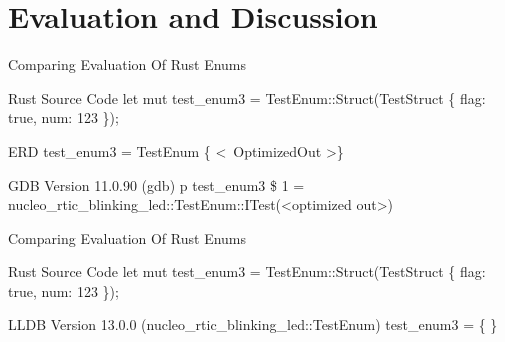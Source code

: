 \section{Evaluation and Discussion}

\begin{frame}{Comparing Evaluation Of Rust Enums}
	\begin{alertblock}{Rust Source Code}
		let mut test\_enum3 = TestEnum::Struct(TestStruct \{ flag: true, num: 123 \});
    	\end{alertblock}

	\begin{block}{ERD}
		test\_enum3 = TestEnum \{ \textless \ OptimizedOut \textgreater \}
    	\end{block}

    	\begin{block}{GDB Version 11.0.90}
		(gdb) p test\_enum3\newline
		\$ 1 = nucleo\_rtic\_blinking\_led::TestEnum::ITest(\textless optimized out\textgreater)
    	\end{block}
\end{frame}


\begin{frame}{Comparing Evaluation Of Rust Enums}
	
	\begin{alertblock}{Rust Source Code}
		let mut test\_enum3 = TestEnum::Struct(TestStruct \{ flag: true, num: 123 \});
    	\end{alertblock}

    	\begin{block}{LLDB Version 13.0.0}
		(nucleo\_rtic\_blinking\_led::TestEnum) test\_enum3 = \{\newline
		\newline
		\newline
		\newline
		\newline
		\text{\ \ \}}\newline
		\newline
		\newline
		\}
    	\end{block}

\end{frame}

